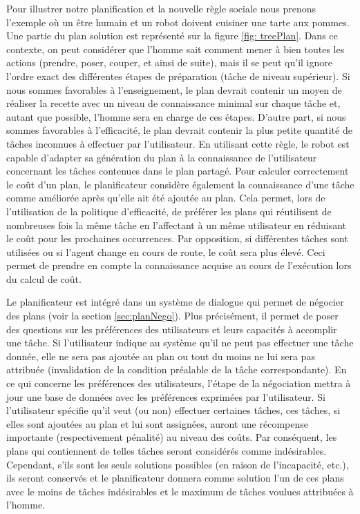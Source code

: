 \documentclass[a4paper,11pt,twoside]{StyleThese}
\begin{document}
Pour illustrer notre planification et la nouvelle règle sociale nous prenons l'exemple où un être humain et un robot doivent cuisiner une tarte aux pommes. Une partie du plan solution est représenté sur la figure \ref{fig: treePlan}. Dans ce contexte, on peut considérer que l'homme sait comment mener à bien toutes les actions (prendre, poser, couper, et ainsi de suite), mais il se peut qu'il ignore  l'ordre exact des différentes étapes de préparation (tâche de niveau supérieur). Si nous sommes favorables à l'enseignement, le plan devrait contenir un moyen de réaliser la recette avec un niveau de connaissance minimal sur chaque tâche et, autant que possible, l'homme sera en charge de ces étapes. D'autre part, si nous sommes favorables à l'efficacité, le plan devrait contenir la plus petite quantité de tâches inconnues à effectuer par l'utilisateur.
En utilisant cette règle, le robot est capable d'adapter sa génération du plan à la connaissance de l'utilisateur concernant les tâches contenues dans le plan partagé.
Pour calculer correctement le coût d'un plan, le planificateur considère également la connaissance d'une tâche comme améliorée après qu'elle ait été ajoutée au plan. Cela permet, lors de l'utilisation de la politique d'efficacité, de préférer les plans qui réutilisent de nombreuses fois la même tâche en l'affectant à un même utilisateur en réduisant le coût pour les prochaines occurrences. Par opposition, si différentes tâches sont utilisées ou si l'agent change en cours de route, le coût sera plus élevé. Ceci permet de prendre en compte la connaissance acquise au cours de l'exécution lors du calcul de coût.

Le planificateur est intégré dans un système de dialogue qui permet de négocier des plans (voir la section \ref{sec:planNego}). Plus précisément, il permet de poser des questions sur les préférences des utilisateurs et leurs capacités à accomplir une tâche. Si l'utilisateur indique au système qu'il ne peut pas effectuer une tâche donnée, elle ne sera pas ajoutée au plan ou tout du moins ne lui sera pas attribuée (invalidation de la condition préalable de la tâche correspondante).
En ce qui concerne les préférences des utilisateurs, l'étape de la négociation mettra à jour une base de données avec les préférences exprimées par l'utilisateur. Si l'utilisateur spécifie qu'il veut (ou non) effectuer certaines tâches, ces tâches, si elles sont ajoutées au plan et lui sont assignées, auront une récompense importante (respectivement pénalité) au niveau des coûts. Par conséquent, les plans qui contiennent de telles tâches seront considérés comme indésirables. Cependant, s'ils sont les seuls solutions possibles (en raison de l'incapacité, etc.), ils seront conservés et le planificateur donnera comme solution l'un de ces plans avec le moins de tâches indésirables et le maximum de tâches voulues attribuées à l'homme.
\end{document}
